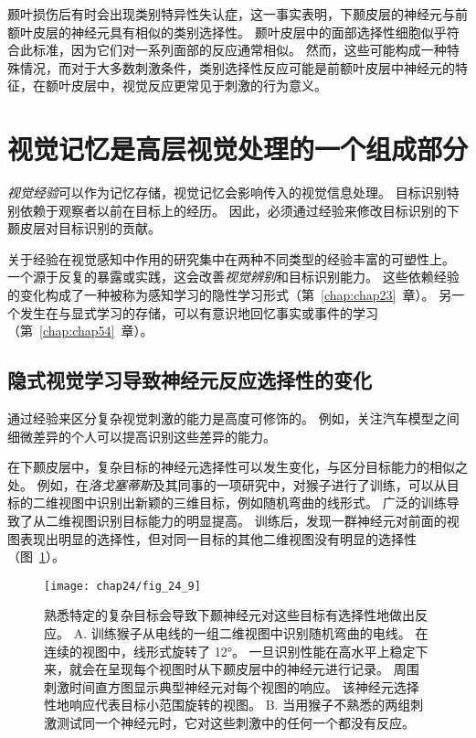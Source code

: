 颞叶损伤后有时会出现类别特异性失认症，这一事实表明，下颞皮层的神经元与前额叶皮层的神经元具有相似的类别选择性。
颞叶皮层中的面部选择性细胞似乎符合此标准，因为它们对一系列面部的反应通常相似。
然而，这些可能构成一种特殊情况，而对于大多数刺激条件，类别选择性反应可能是前额叶皮层中神经元的特征，在额叶皮层中，视觉反应更常见于刺激的行为意义。



\section{视觉记忆是高层视觉处理的一个组成部分}

\textit{视觉经验}可以作为记忆存储，视觉记忆会影响传入的视觉信息处理。
目标识别特别依赖于观察者以前在目标上的经历。
因此，必须通过经验来修改目标识别的下颞皮层对目标识别的贡献。


关于经验在视觉感知中作用的研究集中在两种不同类型的经验丰富的可塑性上。
一个源于反复的暴露或实践，这会改善\textit{视觉辨别}和目标识别能力。
这些依赖经验的变化构成了一种被称为感知学习的隐性学习形式（第~\ref{chap:chap23}~章）。
另一个发生在与显式学习的存储，可以有意识地回忆事实或事件的学习（第~\ref{chap:chap54}~章）。



\subsection{隐式视觉学习导致神经元反应选择性的变化}

通过经验来区分复杂视觉刺激的能力是高度可修饰的。
例如，关注汽车模型之间细微差异的个人可以提高识别这些差异的能力。


在下颞皮层中，复杂目标的神经元选择性可以发生变化，与区分目标能力的相似之处。
例如，在\textit{洛戈塞蒂斯}及其同事的一项研究中，对猴子进行了训练，可以从目标的二维视图中识别出新颖的三维目标，例如随机弯曲的线形式。
广泛的训练导致了从二维视图识别目标能力的明显提高。
训练后，发现一群神经元对前面的视图表现出明显的选择性，但对同一目标的其他二维视图没有明显的选择性（图~\ref{fig:24_9}）。


\begin{figure}[htbp]
	\centering
	\texttt{[image: chap24/fig\_24\_9]}
	\caption{熟悉特定的复杂目标会导致下颞神经元对这些目标有选择性地做出反应。
		A. 训练猴子从电线的一组二维视图中识别随机弯曲的电线。 在连续的视图中，线形式旋转了 12°。
		一旦识别性能在高水平上稳定下来，就会在呈现每个视图时从下颞皮层中的神经元进行记录。
		周围刺激时间直方图显示典型神经元对每个视图的响应。
		该神经元选择性地响应代表目标小范围旋转的视图。
		B. 当用猴子不熟悉的两组刺激测试同一个神经元时，它对这些刺激中的任何一个都没有反应。}
	\label{fig:24_9}
\end{figure}


